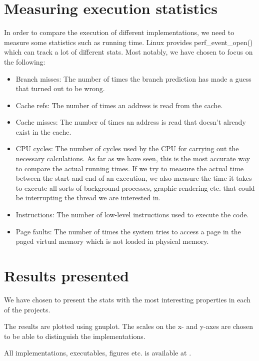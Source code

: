 \section{Measuring execution statistics} \label{section:perf_stat}
In order to compare the execution of different implementations, we need to
measure some statistics such as running time. 
Linux provides perf\_event\_open() \citep{perfStat} which can track a lot of
different stats. Most notably, we have chosen to focus on the following:
\begin{itemize}
 \item Branch misses: The number of times the branch prediction has made a guess
that turned out to be wrong.
 \item Cache refs: The number of times an address is read from the cache.
 \item Cache misses: The number of times an address is read that doesn't already
exist in the cache.
 \item CPU cycles: The number of cycles used by the CPU for carrying out the
necessary calculations. As far as we have seen, this is the most accurate way to
compare the actual running times. If we try to measure the actual time between
the start and end of an execution, we also measure the time it takes to execute
all sorts of background processes, graphic rendering etc. that could be
interrupting the thread we are interested in.
 
 \item Instructions: The number of low-level instructions used to execute the
code.
 \item Page faults: The number of times the system tries to access a page in the paged virtual memory which is not loaded in physical memory.
\end{itemize}




\section{Results presented}
We have chosen to present the stats with the most interesting properties in each
of the projects.

The results are plotted using gnuplot.
The scales on the x- and y-axes are chosen to be able to distinguish the
implementations.


All implementations, executables, figures etc. is available at \citep{github}.